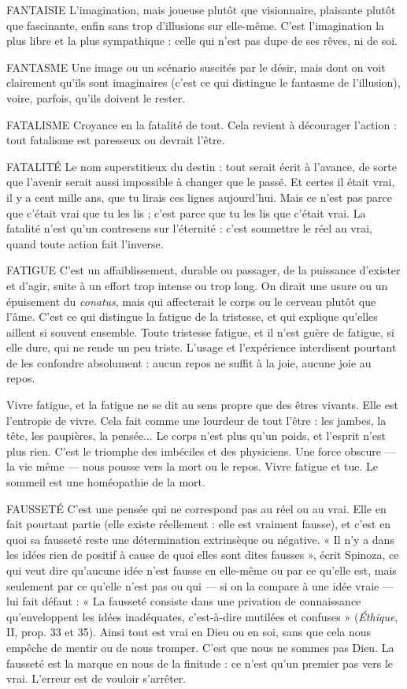 FANTAISIE  L’imagination, mais joueuse plutôt que visionnaire, plaisante
plutôt que fascinante, enfin sans trop d'illusions sur elle-même.
C’est l'imagination la plus libre et la plus sympathique : celle qui n’est pas dupe
de ses rêves, ni de soi.

FANTASME Une image ou un scénario suscités par le désir, mais dont on
voit clairement qu’ils sont imaginaires (c’est ce qui distingue le
fantasme de l'illusion), voire, parfois, qu’ils doivent le rester.

FATALISME Croyance en la fatalité de tout. Cela revient à décourager
l’action : tout fatalisme est paresseux ou devrait l'être.

FATALITÉ Le nom superstitieux du destin : tout serait écrit à l'avance, de
sorte que l'avenir serait aussi impossible à changer que le passé.
Et certes il était vrai, il y a cent mille ans, que tu lirais ces lignes aujourd’hui.
Mais ce n’est pas parce que c'était vrai que tu les lis ; c’est parce que tu les lis
que c'était vrai. La fatalité n’est qu’un contresens sur l’éternité : c’est soumettre
le réel au vrai, quand toute action fait l'inverse.

FATIGUE C’est un affaiblissement, durable ou passager, de la puissance
d’exister et d’agir, suite à un effort trop intense ou trop long. On
dirait une usure ou un épuisement du {\it conatus}, mais qui affecterait le corps ou
le cerveau plutôt que l’âme. C’est ce qui distingue la fatigue de la tristesse, et
qui explique qu’elles aillent si souvent ensemble. Toute tristesse fatigue, et il
n'est guère de fatigue, si elle dure, qui ne rende un peu triste. L'usage et l’expérience
interdisent pourtant de les confondre absolument : aucun repos ne suffit
à la joie, aucune joie au repos.

Vivre fatigue, et la fatigue ne se dit au sens propre que des êtres vivants. Elle
est l’entropie de vivre. Cela fait comme une lourdeur de tout l’être : les jambes,
la tête, les paupières, la pensée... Le corps n’est plus qu’un poids, et l'esprit
n’est plus rien. C’est le triomphe des imbéciles et des physiciens. Une force obscure
— la vie même — nous pousse vers la mort ou le repos. Vivre fatigue et tue.
Le sommeil est une homéopathie de la mort.

FAUSSETÉ C’est une pensée qui ne correspond pas au réel ou au vrai. Elle
en fait pourtant partie (elle existe réellement : elle est vraiment
fausse), et c’est en quoi sa fausseté reste une détermination extrinsèque ou négative.
« Il n’y a dans les idées rien de positif à cause de quoi elles sont dites
fausses », écrit Spinoza, ce qui veut dire qu'aucune idée n’est fausse en elle-même
ou par ce qu’elle est, mais seulement par ce qu’elle n’est pas ou qui — si
on la compare à une idée vraie — lui fait défaut : « La fausseté consiste dans une
privation de connaissance qu’enveloppent les idées inadéquates, c’est-à-dire
mutilées et confuses » ({\it Éthique}, II, prop. 33 et 35). Ainsi tout est vrai en Dieu
ou en soi, sans que cela nous empêche de mentir ou de nous tromper. C’est que
nous ne sommes pas Dieu. La fausseté est la marque en nous de la finitude : ce
n’est qu’un premier pas vers le vrai. L'erreur est de vouloir s’arrêter.

